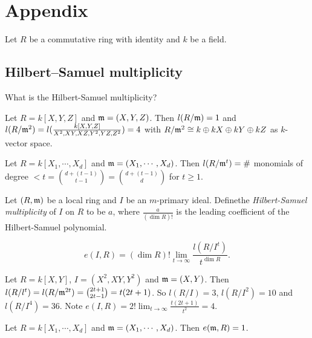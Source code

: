 \chapter{Appendix}

Let $R$ be a commutative ring with identity and $k$ be a field. 

\section{Hilbert–Samuel multiplicity}

\begin{question}
    What is the Hilbert-Samuel multiplicity? 
\end{question}

\begin{example}
    Let $R = k[X,Y,Z]$ and $\mathfrak{m} = (X,Y,Z)$. Then $l(R/\mathfrak{m}) = 1$ and $l(R/\mathfrak{m}^{2}) = l(\frac{k[X,Y,Z]}{X^{2},XY,XZ,Y^{2},YZ,Z^{2}}) = 4$ with $R/\mathfrak{m}^{2} \cong k \oplus kX \oplus kY \oplus kZ$ as $k$-vector space.
\end{example}

\begin{theorem}
    Let $R = k[X_1,\cdots,X_d]$ and $\mathfrak{m} = (X_1,\cdots,X_d)$. Then $l(R/\mathfrak{m}^{t}) = \#$ monomials of degree  $< t = \binom {d + (t-1)}{t-1} = \binom {d+(t-1)}{d}$ for $t \geq 1$.
\end{theorem}

\begin{definition}
    Let $(R,\mathfrak{m})$ be a local ring and $I$ be an $m$-primary ideal. Definethe \emph{Hilbert-Samuel multiplicity} of $I$ on $R$ to be $a$, where $\frac{a}{(\dim R)!}$ is the leading coefficient of the Hilbert-Samuel polynomial.
\end{definition}

\begin{definition}
    \[e(I,R) = (\dim R)! \lim_{t \to \infty} \frac{l(R/I^{t})}{t^{\dim R}}.\]
\end{definition}

\begin{example}
    Let $R = k[X,Y]$, $I = (X^{2},XY,Y^{2})$ and $\mathfrak{m} = (X,Y)$. Then $l(R/l^{t}) = l(R/\mathfrak{m}^{2t}) = \binom {2t+1}{2t-1} = t(2t+1)$. So $l(R/I) = 3$, $l(R/I^{2}) = 10$ and $l(R/I^{4}) = 36$. Note $e(I,R) = 2! \lim_{t \to \infty} \frac{t(2t+1)}{t^{2}} = 4$.
\end{example}

\begin{fact}
    Let $R = k[X_1,\cdots,X_d]$ and $\mathfrak{m} = (X_1,\cdots,X_d)$. Then $e(\mathfrak{m},R) = 1$.
\end{fact}

